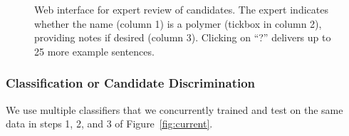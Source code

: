\begin{figure}
\centering
{}
\caption{\label{fig:polyner} Web interface for expert review of candidates.
The expert indicates whether the name (column 1) is a polymer (tickbox in column 2), 
providing notes if desired (column 3). 
Clicking on ``?'' delivers up to 25 more example sentences.
}
\end{figure}

\subsubsection{Classification or Candidate Discrimination}
We use multiple classifiers that we concurrently trained and test on the same data in steps 1, 2, and 3 of Figure~\ref{fig:current}.





